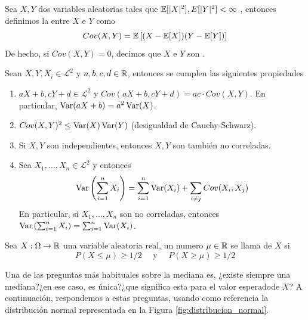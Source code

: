 \begin{definicion}[Covarianza]
    Sea $X, Y$ dos variables aleatorias tales que $\mathbb{E}[|X|^2], E[|Y|^2] < \infty$ , entonces definimos la  entre $X$ e $Y$ como
    \begin{equation*}
        Cov(X,Y) = \mathbb{E}\left[ (X - \mathbb{E}[X]) (Y - \mathbb{E}[Y]) \right]
    \end{equation*}
    De hecho, si $Cov(X,Y)=0$, decimos que $X$ e $Y$ son .
\end{definicion}

\begin{teo}
    Sean $X, Y, X_i \in \mathcal{L}^2$ y $a, b, c, d \in \mathbb{R}$, entonces se cumplen las siguientes propiedades
    \begin{enumerate}[label=(\alph*)]
        \item $aX + b, cY + d \in \mathcal{L}^2$ y $Cov(aX + b, cY + d) = ac \cdot Cov(X,Y)$. En particular, $\operatorname{Var}(aX + b) = a^2 \operatorname{Var}(X)$.
        \item $Cov(X,Y)^2 \leq \operatorname{Var}(X) \operatorname{Var}(Y)$ (desigualdad de Cauchy-Schwarz).
        \item Si $X,Y$ son independientes, entonces $X,Y$ son también no correladas.
        \item Sea $X_1, \ldots, X_n \in \mathcal{L}^2$ y entonces
        \begin{equation*}
            \operatorname{Var}\left( \sum_{i=1}^n X_i \right) = \sum_{i=1}^n \operatorname{Var}(X_i) + \sum_{i \neq j} Cov(X_i, X_j)
        \end{equation*}
        En particular, si $X_1, \ldots, X_n$ son no correladas, entonces $\operatorname{Var}\left( \sum_{i=1}^n X_i \right) = \sum_{i=1}^n \operatorname{Var}(X_i)$.
    \end{enumerate}
\end{teo}

\begin{definicion}[Mediana]
    Sea $X:\Omega \to \mathbb{R}$ una variable aleatoria real, un numero $\mu \in \mathbb{R}$ se llama  de $X$ si
    \begin{equation*}
        P(X \leq \mu) \geq 1/2 \quad \text{ y } \quad P(X \geq \mu) \geq 1/2
    \end{equation*}
\end{definicion}

\noindent
Una de las preguntas más habituales sobre la mediana es, ¿existe siempre una mediana?¿en ese caso, es única?¿que significa esta para el valor esperadode $X$? A continuación, respondemos a estas preguntas, usando como referencia la distribución normal representada en la Figura \ref{fig:distribucion_normal}.

